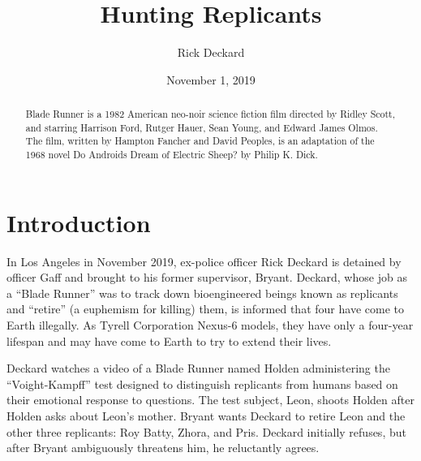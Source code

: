 \documentclass{article}
\title{Hunting Replicants}
\author{Rick Deckard}
\date{November 1, 2019}
\begin{document}
\maketitle

\begin{abstract}
Blade Runner is a 1982 American neo-noir science fiction film directed by Ridley Scott, and starring Harrison Ford, Rutger Hauer, Sean Young, and Edward James Olmos. The film, written by Hampton Fancher and David Peoples, is an adaptation of the 1968 novel Do Androids Dream of Electric Sheep? by Philip K. Dick.
\end{abstract}

\section*{Introduction}

In Los Angeles in November 2019, ex-police officer Rick Deckard is detained by officer Gaff and brought to his former supervisor, Bryant. Deckard, whose job as a ``Blade Runner'' was to track down bioengineered beings known as replicants and ``retire'' (a euphemism for killing) them, is informed that four have come to Earth illegally. As Tyrell Corporation Nexus-6 models, they have only a four-year lifespan and may have come to Earth to try to extend their lives.

Deckard watches a video of a Blade Runner named Holden administering the ``Voight-Kampff'' test designed to distinguish replicants from humans based on their emotional response to questions. The test subject, Leon, shoots Holden after Holden asks about Leon's mother. Bryant wants Deckard to retire Leon and the other three replicants: Roy Batty, Zhora, and Pris. Deckard initially refuses, but after Bryant ambiguously threatens him, he reluctantly agrees.
\end{document}
